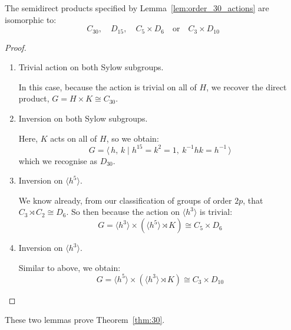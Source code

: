 \begin{lemma}
    The semidirect products specified by Lemma~\ref{lem:order_30_actions} are isomorphic to:
    \[
        C_{30}, \quad%
        D_{15}, \quad%
        C_5 \times D_6 \quad \text{or} \quad%
        C_3 \times D_{10}
    \]
\end{lemma}

\begin{proof}
    \mbox{}
    \begin{enumerate}
        \item Trivial action on both Sylow subgroups.

            In this case, because the action is trivial on all of \(H\), we recover the direct product, \(G = H \times K
            \cong C_{30}\).
        \item Inversion on both Sylow subgroups.

            Here, \(K\) acts on all of \(H\), so we obtain:
            \[G = \langle\, h,\,k \mid h^{15} = k^2 = 1,\ k^{-1}hk = h^{-1}\,\rangle\]
            which we recognise as \(D_{30}\).
        \item Inversion on \(\langle h^5 \rangle\).

            We know already, from our classification of groups of order \(2p\), that \(C_3 \rtimes C_2 \cong D_6\).
            So then because the action on \(\langle h^3 \rangle\) is trivial:
            \[G = \langle h^3 \rangle \times (\langle h^5 \rangle \rtimes K) \cong C_5 \times D_6\]
        \item Inversion on \(\langle h^3 \rangle\).

            Similar to above, we obtain:
            \[G = \langle h^5 \rangle \times (\langle h^3 \rangle \rtimes K) \cong C_3 \times D_{10}\]
    \end{enumerate}
\end{proof}

These two lemmas prove Theorem~\ref{thm:30}.

